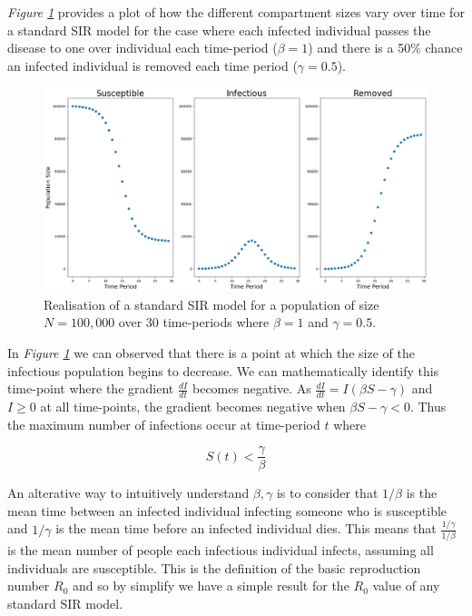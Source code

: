 \documentclass[11pt,a4paper]{article}
\theoremstyle{break}
\begin{document}
  \par \textit{Figure \ref{fig_example_standard_sir_model}} provides a plot of how the different compartment sizes vary over time for a standard SIR model for the case where each infected individual passes the disease to one over individual each time-period ($\beta=1$) and there is a 50\% chance an infected individual is removed each time period ($\gamma=0.5$).

  \begin{figure}[H]
    \centering\includegraphics[width=.9\textwidth]{example_sir_model.png}
    \caption{Realisation of a standard SIR model for a population of size $N=100,000$ over 30 time-periods where $\beta=1$ and $\gamma=0.5$.}
    \label{fig_example_standard_sir_model}
  \end{figure}

  \par In \textit{Figure \ref{fig_example_standard_sir_model}} we can observed that there is a point at which the size of the infectious population begins to decrease. We can mathematically identify this time-point where the gradient $\frac{dI}{dt}$ becomes negative. As $\frac{dI}{dt}=I(\beta S-\gamma)$ and $I\geq0$ at all time-points, the gradient becomes negative when $\beta S-\gamma<0$. Thus the maximum number of infections occur at time-period $t$ where

  \begin{equation}\label{eqn_sir_max_infections}
    S(t)<\frac\gamma\beta
  \end{equation}


  \par An alterative way to intuitively understand $\beta,\gamma$ is to consider that $1/\beta$ is the mean time between an infected individual infecting someone who is susceptible and $1/\gamma$ is the mean time before an infected individual dies. This means that $\frac{1/\gamma}{1/\beta}$ is the mean number of people each infectious individual infects, assuming all individuals are susceptible. This is the definition of the basic reproduction number $R_0$ and so by simplify we have a simple result for the $R_0$ value of any standard SIR model.
\end{document}
